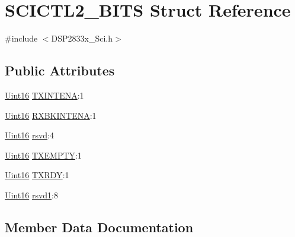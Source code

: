 \hypertarget{struct_s_c_i_c_t_l2___b_i_t_s}{}\section{S\+C\+I\+C\+T\+L2\+\_\+\+B\+I\+T\+S Struct Reference}
\label{struct_s_c_i_c_t_l2___b_i_t_s}


{\ttfamily \#include $<$D\+S\+P2833x\+\_\+\+Sci.\+h$>$}

\subsection*{Public Attributes}
\begin{DoxyCompactItemize}
\item 
\hyperlink{_d_s_p2833x___device_8h_a59a9f6be4562c327cbfb4f7e8e18f08b}{Uint16} \hyperlink{struct_s_c_i_c_t_l2___b_i_t_s_af8fa2544ee6ef6724d617ff68a5a32fa}{T\+X\+I\+N\+T\+E\+N\+A}\+:1
\item 
\hyperlink{_d_s_p2833x___device_8h_a59a9f6be4562c327cbfb4f7e8e18f08b}{Uint16} \hyperlink{struct_s_c_i_c_t_l2___b_i_t_s_afb52fadf6a85fb81ec45feb5462c6f2c}{R\+X\+B\+K\+I\+N\+T\+E\+N\+A}\+:1
\item 
\hyperlink{_d_s_p2833x___device_8h_a59a9f6be4562c327cbfb4f7e8e18f08b}{Uint16} \hyperlink{struct_s_c_i_c_t_l2___b_i_t_s_a1cf83e4a3f981e2271cba4b3b203f14c}{rsvd}\+:4
\item 
\hyperlink{_d_s_p2833x___device_8h_a59a9f6be4562c327cbfb4f7e8e18f08b}{Uint16} \hyperlink{struct_s_c_i_c_t_l2___b_i_t_s_ac0f9bcf6d34edf35024dd37e9b5a07cc}{T\+X\+E\+M\+P\+T\+Y}\+:1
\item 
\hyperlink{_d_s_p2833x___device_8h_a59a9f6be4562c327cbfb4f7e8e18f08b}{Uint16} \hyperlink{struct_s_c_i_c_t_l2___b_i_t_s_a1422489e431e53a8cfbc45e1ef31c882}{T\+X\+R\+D\+Y}\+:1
\item 
\hyperlink{_d_s_p2833x___device_8h_a59a9f6be4562c327cbfb4f7e8e18f08b}{Uint16} \hyperlink{struct_s_c_i_c_t_l2___b_i_t_s_a238c5945b0b08c11431d0e3579df9f29}{rsvd1}\+:8
\end{DoxyCompactItemize}


\subsection{Member Data Documentation}
\hypertarget{struct_s_c_i_c_t_l2___b_i_t_s_a1cf83e4a3f981e2271cba4b3b203f14c}{}
